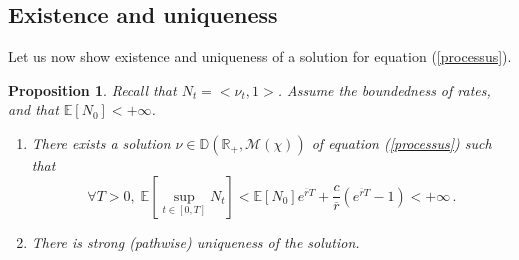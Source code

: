 \documentclass[a4paper,11pt]{article}
\newtheorem{prop}[theo]{Proposition}
\begin{document}
\subsection{Existence and uniqueness}
Let us now show existence and uniqueness of a solution for equation (\ref{processus}).
\begin{prop}\label{existence}
Recall that $N_t = <\nu_t,1>$. Assume the boundedness of rates, and that $\mathbb{E}[N_0]<+\infty$.
\begin{enumerate}
\item There exists a solution $\nu \in \mathbb{D}(\mathbb{R}_+,\mathcal{M}(\chi))$ of equation (\ref{processus}) such that
\begin{equation}\label{controlNt}
\forall T>0,\; \mathbb{E}\left[\sup_{t\in [0,T]} N_t\right]<\mathbb{E}\left[ N_0\right]e^{\overline{r}T} + \frac{c}{\overline{r}}(e^{\overline{r}T}-1)<+\infty\,. 
\end{equation}
\item There is strong (pathwise) uniqueness of the solution. 
\end{enumerate}
\end{prop}
\end{document}
